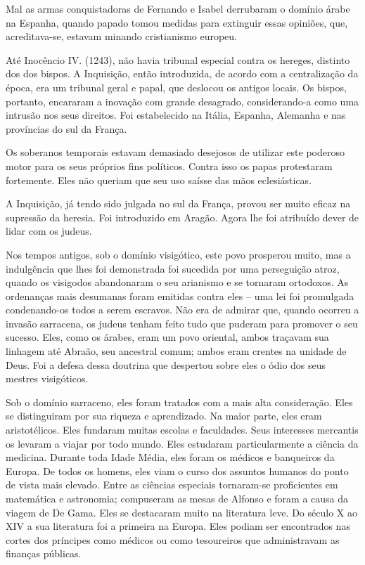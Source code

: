 \documentclass[11pt,a5paper,twoside,openany]{book}
\begin{document}
Mal as armas conquistadoras de Fernando e Isabel derrubaram o domínio árabe na Espanha, quando papado tomou medidas para extinguir essas opiniões, que, acreditava-se, estavam minando cristianismo europeu.

Até Inocêncio IV. (1243), não havia tribunal especial contra os hereges, distinto dos dos bispos. A Inquisição, então introduzida, de acordo com a centralização da época, era um tribunal geral e papal, que deslocou os antigos locais. Os bispos, portanto, encararam a inovação com grande desagrado, considerando-a como uma intrusão nos seus direitos. Foi estabelecido na Itália, Espanha, Alemanha e nas províncias do sul da França.

Os soberanos temporais estavam demasiado desejosos de utilizar este poderoso motor para os seus próprios fins políticos. Contra isso os papas protestaram fortemente. Eles não queriam que seu uso saísse das mãos eclesiásticas.

A Inquisição, já tendo sido julgada no sul da França, provou ser muito eficaz na supressão da heresia. Foi introduzido em Aragão. Agora lhe foi atribuído dever de lidar com os judeus.

Nos tempos antigos, sob o domínio visigótico, este povo prosperou muito, mas a indulgência que lhes foi demonstrada foi sucedida por uma perseguição atroz, quando os visigodos abandonaram o seu arianismo e se tornaram ortodoxos. As ordenanças mais desumanas foram emitidas contra eles – uma lei foi promulgada condenando-os todos a serem escravos. Não era de admirar que, quando ocorreu a invasão sarracena, os judeus tenham feito tudo que puderam para promover o seu sucesso. Eles, como os árabes, eram um povo oriental, ambos traçavam sua linhagem até Abraão, seu ancestral comum; ambos eram crentes na unidade de Deus. Foi a defesa dessa doutrina que despertou sobre eles o ódio dos seus mestres visigóticos.

Sob o domínio sarraceno, eles foram tratados com a mais alta consideração. Eles se distinguiram por sua riqueza e aprendizado. Na maior parte, eles eram aristotélicos. Eles fundaram muitas escolas e faculdades. Seus interesses mercantis os levaram a viajar por todo mundo. Eles estudaram particularmente a ciência da medicina. Durante toda Idade Média, eles foram os médicos e banqueiros da Europa. De todos os homens, eles viam o curso dos assuntos humanos do ponto de vista mais elevado. Entre as ciências especiais tornaram-se proficientes em matemática e astronomia; compuseram as mesas de Alfonso e foram a causa da viagem de De Gama. Eles se destacaram muito na literatura leve. Do século X ao XIV a sua literatura foi a primeira na Europa. Eles podiam ser encontrados nas cortes dos príncipes como médicos ou como tesoureiros que administravam as finanças públicas.
\end{document}
